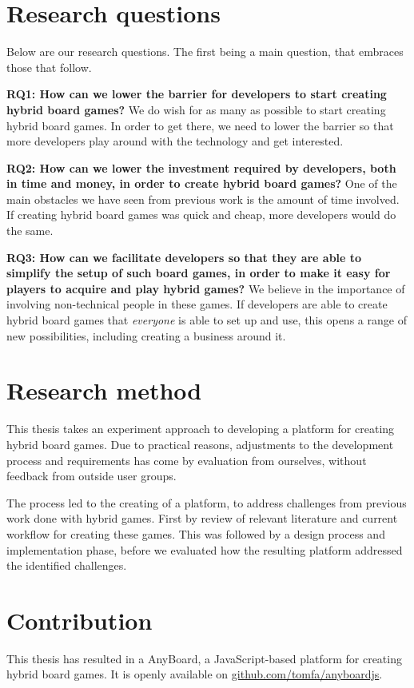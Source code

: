 \section{Research questions}

Below are our research questions. The first being a main question, that embraces those that follow.

\textbf{RQ1: How can we lower the barrier for developers to start creating hybrid board games?}
We do wish for as many as possible to start creating hybrid board games. In order to get there, we need to lower the barrier so that more developers play around with the technology and get interested.

\textbf{RQ2: How can we lower the investment required by developers, both in time and money, in order to create hybrid board games?}
One of the main obstacles we have seen from previous work is the amount of time involved. If creating hybrid board games was quick and cheap, more developers would do the same.

\textbf{RQ3: How can we facilitate developers so that they are able to simplify the setup of such board games, in order to make it easy for players to acquire and play hybrid games?}
We believe in the importance of involving non-technical people in these games. If developers are able to create hybrid board games that \emph{everyone} is able to set up and use, this opens a range of new possibilities, including creating a business around it.

\section{Research method}
This thesis takes an experiment approach to developing a platform for creating hybrid board games. Due to practical reasons, adjustments to the development process and requirements has come by evaluation from ourselves, without feedback from outside user groups.

The process led to the creating of a platform, to address challenges from previous work done with hybrid games. First by review of relevant literature and current workflow for creating these games. This was followed by a design process and implementation phase, before we evaluated how the resulting platform addressed the identified challenges.

\section{Contribution}
This thesis has resulted in a AnyBoard, a JavaScript-based platform for creating hybrid board games. It is openly available on \href{https://github.com/tomfa/anyboardjs}{github.com/tomfa/anyboardjs}.

